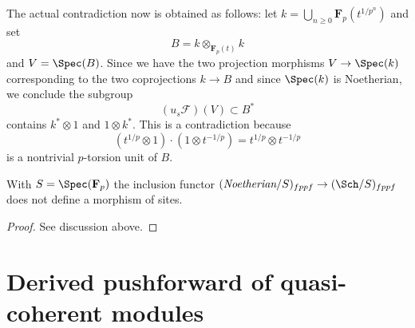 \medskip\noindent
The actual contradiction now is obtained as follows:
let $k = \bigcup_{n \geq 0} \mathbf{F}_p(t^{1/{p^n}})$
and set
$$
B = k \otimes_{\mathbf{F}_p(t)} k
$$
and $V = \Spec(B)$. Since we have the two projection morphisms
$V \to \Spec(k)$ corresponding to the two coprojections $k \to B$
and since $\Spec(k)$ is Noetherian, we conclude the subgroup
$$
(u_s\mathcal{F})(V) \subset B^*
$$
contains $k^* \otimes 1$ and $1 \otimes k^*$. This is a contradiction
because
$$
(t^{1/p} \otimes 1) \cdot (1 \otimes t^{-1/p}) =
t^{1/p} \otimes t^{-1/p}
$$
is a nontrivial $p$-torsion unit of $B$.

\begin{lemma}
\label{lemma-not-a-morphism-of-sites-noetherian-to-all}
With $S = \Spec(\mathbf{F}_p)$ the inclusion functor
$(\textit{Noetherian}/S)_{fppf} \to (\Sch/S)_{fppf}$
does not define a morphism of sites.
\end{lemma}

\begin{proof}
See discussion above.
\end{proof}





\section{Derived pushforward of quasi-coherent modules}
\label{section-derived-push-quasi-coherent}

